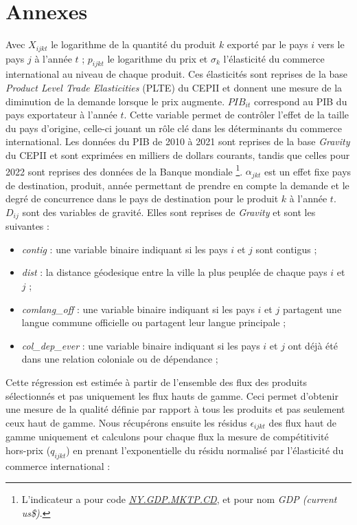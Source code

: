 \documentclass[french,10pt,a4paper]{article}
\newenvironment{annexes}{
    \section*{Annexes}
    \addcontentsline{toc}{section}{Annexes}
    \setstretch{2} %
}{
    \setstretch{1} %
}
\begin{document}
\begin{annexes}
\noindent Avec $X_{ijkt}$ le logarithme de la quantité du produit $k$ exporté par le pays $i$ vers le pays $j$ à l'année $t$ ; $p_{ijkt}$ le logarithme du prix et $\sigma_{k}$ l'élasticité du commerce international au niveau de chaque produit. Ces élasticités sont reprises de la base \textit{Product Level Trade Elasticities} (PLTE) du CEPII \citep{Fontagne2019} et donnent une mesure de la diminution de la demande lorsque le prix augmente. $PIB_{it}$ correspond au PIB du pays exportateur à l'année $t$. Cette variable permet de contrôler l'effet de la taille du pays d'origine, celle-ci jouant un rôle clé dans les déterminants du commerce international. Les données du PIB de 2010 à 2021 sont reprises de la base \textit{Gravity} du CEPII \citep{Conte2022} et sont exprimées en milliers de dollars courants, tandis que celles pour 2022 sont reprises des données de la Banque mondiale \footnote{L'indicateur a pour code \href{https://donnees.banquemondiale.org/indicateur/NY.GDP.MKTP.CD}{\textit{NY.GDP.MKTP.CD}}, et pour nom \textit{GDP (current us\$)}.}. $\alpha_{jkt}$ est un effet fixe pays de destination, produit, année permettant de prendre en compte la demande et le degré de concurrence dans le pays de destination pour le produit $k$ à l'année $t$. $D_{ij}$ sont des variables de gravité. Elles sont reprises de \textit{Gravity} et sont les suivantes :

\begin{itemize}
  \item \textit{contig} : une variable binaire indiquant si les pays $i$ et $j$ sont contigus ;
  \item \textit{dist} : la distance géodesique entre la ville la plus peuplée de chaque pays $i$ et $j$ ;
  \item \textit{comlang\_off} : une variable binaire indiquant si les pays $i$ et $j$ partagent une langue commune officielle ou partagent leur langue principale ;
  \item \textit{col\_dep\_ever} : une variable binaire indiquant si les pays $i$ et $j$ ont déjà été dans une relation coloniale ou de dépendance ;
\end{itemize}

\bigskip

Cette régression est estimée à partir de l'ensemble des flux des produits sélectionnés et pas uniquement les flux hauts de gamme. Ceci permet d'obtenir une mesure de la qualité définie par rapport à tous les produits et pas seulement ceux haut de gamme. Nous récupérons ensuite les résidus $\epsilon_{ijkt}$ des flux haut de gamme uniquement et calculons pour chaque flux la mesure de compétitivité hors-prix ($q_{ijkt}$) en prenant l'exponentielle du résidu normalisé par l'élasticité du commerce international : 


\end{annexes}
\end{document}
